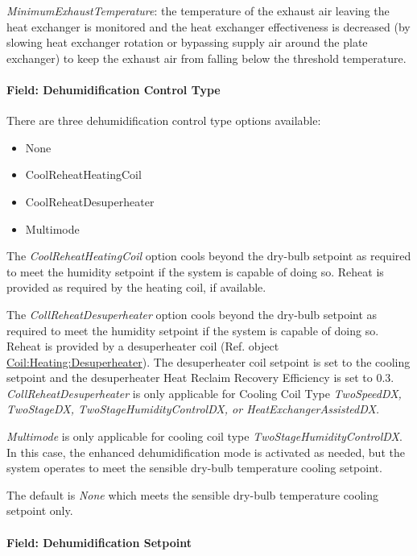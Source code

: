 \emph{MinimumExhaustTemperature}: the temperature of the exhaust air leaving the heat exchanger is monitored and the heat exchanger effectiveness is decreased (by slowing heat exchanger rotation or bypassing supply air around the plate exchanger) to keep the exhaust air from falling below the threshold temperature.

\paragraph{Field: Dehumidification Control Type}\label{field-dehumidification-control-type-7}

There are three dehumidification control type options available:

\begin{itemize}
\item
  None
\item
  CoolReheatHeatingCoil
\item
  CoolReheatDesuperheater
\item
  Multimode
\end{itemize}

The \emph{CoolReheatHeatingCoil} option cools beyond the dry-bulb setpoint as required to meet the humidity setpoint if the system is capable of doing so. Reheat is provided as required by the heating coil, if available.

The \emph{CollReheatDesuperheater} option cools beyond the dry-bulb setpoint as required to meet the humidity setpoint if the system is capable of doing so. Reheat is provided by a desuperheater coil (Ref. object \hyperref[coilheatingdesuperheater]{Coil:Heating:Desuperheater}). The desuperheater coil setpoint is set to the cooling setpoint and the desuperheater Heat Reclaim Recovery Efficiency is set to 0.3. \emph{CollReheatDesuperheater} is only applicable for Cooling Coil Type \emph{TwoSpeedDX, TwoStageDX, TwoStageHumidityControlDX, or HeatExchangerAssistedDX.}

\emph{Multimode} is only applicable for cooling coil type \emph{TwoStageHumidityControlDX}. In this case, the enhanced dehumidification mode is activated as needed, but the system operates to meet the sensible dry-bulb temperature cooling setpoint.

The default is \emph{None} which meets the sensible dry-bulb temperature cooling setpoint only.

\paragraph{Field: Dehumidification Setpoint}\label{field-dehumidification-setpoint-4}

